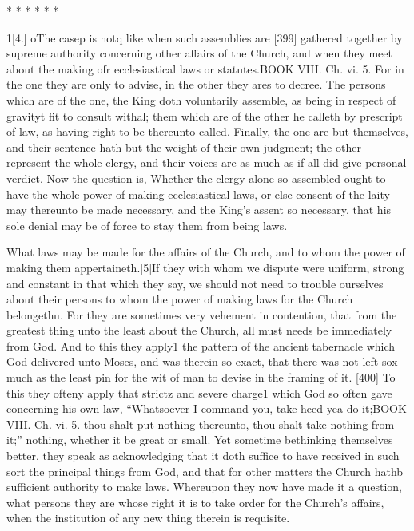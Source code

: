 * * * * * *

1[4.] oThe casep is notq like when such assemblies are [399] gathered together by supreme authority concerning other affairs of the Church, and when they meet about the making ofr ecclesiastical laws or statutes.BOOK VIII. Ch. vi. 5. For in the one they are only to advise, in the other they ares to decree. The persons which are of the one, the King doth voluntarily assemble, as being in respect of gravityt fit to consult withal; them which are of the other he calleth by prescript of law, as having right to be thereunto called. Finally, the one are but themselves, and their sentence hath but the weight of their own judgment; the other represent the whole clergy, and their voices are as much as if all did give personal verdict. Now the question is, Whether the clergy alone so assembled ought to have the whole power of making ecclesiastical laws, or else consent of the laity may thereunto be made necessary, and the King’s assent so necessary, that his sole denial may be of force to stay them from being laws.

What laws may be made for the affairs of the Church, and to whom the power of making them appertaineth.[5]If they with whom we dispute were uniform, strong and constant in that which they say, we should not need to trouble ourselves about their persons to whom the power of making laws for the Church belongethu. For they are sometimes very vehement in contention, that from the greatest thing unto the least about the Church, all must needs be immediately from God. And to this they apply1 the pattern of the ancient tabernacle which God delivered unto Moses, and was therein so exact, that there was not left sox much as the least pin for the wit of man to devise in the framing of it. [400] To this they ofteny apply that strictz and severe charge1 which God so often gave concerning his own law, “Whatsoever I command you, take heed yea do it;BOOK VIII. Ch. vi. 5. thou shalt put nothing thereunto, thou shalt take nothing from it;” nothing, whether it be great or small. Yet sometime bethinking themselves better, they speak as acknowledging that it doth suffice to have received in such sort the principal things from God, and that for other matters the Church hathb sufficient authority to make laws. Whereupon they now have made it a question, what persons they are whose right it is to take order for the Church’s affairs, when the institution of any new thing therein is requisite.

